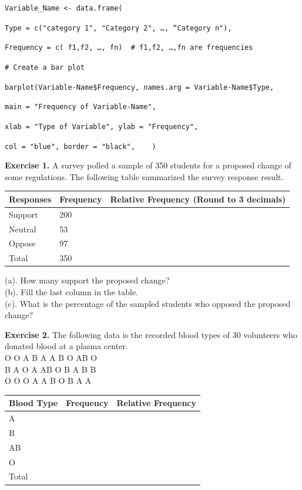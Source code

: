 \documentclass[
]{book}
\begin{document}
\texttt{Variable\_Name\ \textless{}-\ data.frame(}

\texttt{Type\ =\ c("category\ 1",\ "Category\ 2",\ …,\ “Category\ n"),}

\texttt{Frequency\ =\ c(\ f1,f2,\ …,\ fn)\ \ \#\ f1,f2,\ …,fn\ are\ frequencies}

\texttt{\#\ Create\ a\ bar\ plot}

\texttt{barplot(Variable-Name\$Frequency,\ names.arg\ =\ Variable-Name\$Type,}

\texttt{main\ =\ "Frequency\ of\ Variable-Name",}

\texttt{xlab\ =\ "Type\ of\ Variable",\ ylab\ =\ "Frequency",}

\texttt{col\ =\ "blue",\ border\ =\ "black",\ \ \ \ )}

\textbf{Exercise 1.} A survey polled a sample of 350 students for a proposed change of some regulations. The following table summarized the survey response result.

\begin{longtable}[]{@{}lll@{}}
\toprule\noalign{}
Responses & Frequency & Relative Frequency (Round to 3 decimals) \\
\midrule\noalign{}
\endhead
\bottomrule\noalign{}
\endlastfoot
Support & 200 & \\
Neutral & 53 & \\
Oppose & 97 & \\
Total & 350 & \\
\end{longtable}

(a). How many support the proposed change?\\
(b). Fill the last column in the table.\\
(c). What is the percentage of the sampled students who opposed the proposed change?

\textbf{Exercise 2.} The following data is the recorded blood types of 30 volunteers who donated blood at a plasma center.\\
O O A B A A B O AB O\\
B A O A AB O B A B B\\
O O O A A B O B A A

\begin{longtable}[]{@{}lll@{}}
\toprule\noalign{}
Blood Type & Frequency & Relative Frequency \\
\midrule\noalign{}
\endhead
\bottomrule\noalign{}
\endlastfoot
A & & \\
B & & \\
AB & & \\
O & & \\
Total & & \\
\end{longtable}
\end{document}
